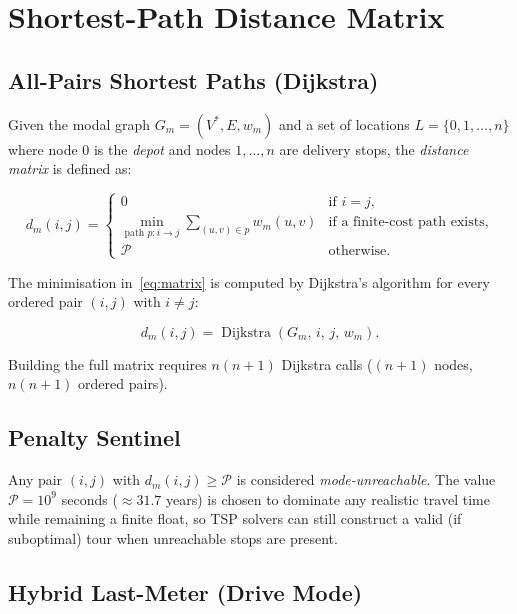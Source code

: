 \documentclass[12pt, a4paper]{article}
\theoremstyle{definition}
\begin{document}
\section{Shortest-Path Distance Matrix}

\subsection{All-Pairs Shortest Paths (Dijkstra)}

Given the modal graph $G_m = (V^*, E, w_m)$ and a set of locations
$L = \{0, 1, \ldots, n\}$ where node $0$ is the \emph{depot} and nodes
$1, \ldots, n$ are delivery stops, the \emph{distance matrix} is defined as:

\begin{equation}
  \label{eq:matrix}
  d_m(i, j) =
  \begin{cases}
    0 & \text{if } i = j, \\
    \displaystyle\min_{\text{path } p: i \to j}
      \sum_{(u,v) \in p} w_m(u,v)
      & \text{if a finite-cost path exists,} \\
    \mathcal{P} & \text{otherwise.}
  \end{cases}
\end{equation}

The minimisation in~\eqref{eq:matrix} is computed by Dijkstra's algorithm for
every ordered pair $(i, j)$ with $i \neq j$:

\[
  d_m(i, j) = \operatorname{Dijkstra}(G_m,\, i,\, j,\, w_m).
\]

Building the full matrix requires $n(n+1)$ Dijkstra calls
($(n+1)$ nodes, $n(n+1)$ ordered pairs).

\subsection{Penalty Sentinel}

Any pair $(i, j)$ with $d_m(i, j) \geq \mathcal{P}$ is considered
\emph{mode-unreachable}.  The value $\mathcal{P} = 10^9$ seconds
($\approx 31.7$ years) is chosen to dominate any realistic travel time while
remaining a finite float, so TSP solvers can still construct a valid (if
suboptimal) tour when unreachable stops are present.

\subsection{Hybrid Last-Meter (Drive Mode)}
\end{document}

